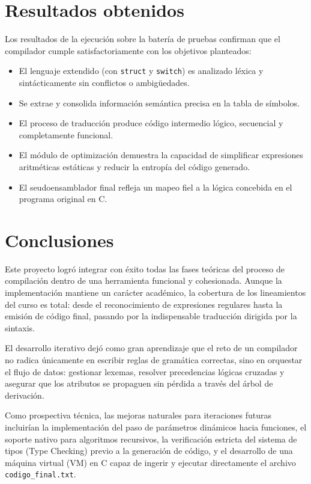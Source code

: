 \documentclass[12pt]{article}
\begin{document}
\section{Resultados obtenidos}
Los resultados de la ejecución sobre la batería de pruebas confirman que el compilador cumple satisfactoriamente con los objetivos planteados:
\begin{itemize}[label={-}]
    \item El lenguaje extendido (con \texttt{struct} y \texttt{switch}) es analizado léxica y sintácticamente sin conflictos o ambigüedades.
    \item Se extrae y consolida información semántica precisa en la tabla de símbolos.
    \item El proceso de traducción produce código intermedio lógico, secuencial y completamente funcional.
    \item El módulo de optimización demuestra la capacidad de simplificar expresiones aritméticas estáticas y reducir la entropía del código generado.
    \item El seudoensamblador final refleja un mapeo fiel a la lógica concebida en el programa original en C.
\end{itemize}

\section{Conclusiones}
Este proyecto logró integrar con éxito todas las fases teóricas del proceso de compilación dentro de una herramienta funcional y cohesionada. Aunque la implementación mantiene un carácter académico, la cobertura de los lineamientos del curso es total: desde el reconocimiento de expresiones regulares hasta la emisión de código final, pasando por la indispensable traducción dirigida por la sintaxis.

El desarrollo iterativo dejó como gran aprendizaje que el reto de un compilador no radica únicamente en escribir reglas de gramática correctas, sino en orquestar el flujo de datos: gestionar lexemas, resolver precedencias lógicas cruzadas y asegurar que los atributos se propaguen sin pérdida a través del árbol de derivación.

Como prospectiva técnica, las mejoras naturales para iteraciones futuras incluirían la implementación del paso de parámetros dinámicos hacia funciones, el soporte nativo para algoritmos recursivos, la verificación estricta del sistema de tipos (Type Checking) previo a la generación de código, y el desarrollo de una máquina virtual (VM) en C capaz de ingerir y ejecutar directamente el archivo \texttt{codigo\_final.txt}.
\end{document}
